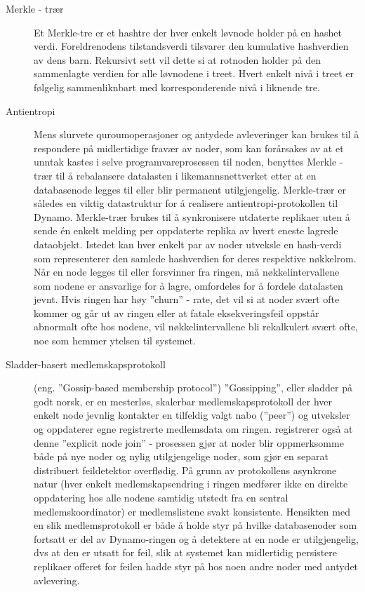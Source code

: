 \begin{description}
  \item [Merkle - trær] Et Merkle-tre er et hashtre der hver enkelt løvnode holder på en hashet verdi. Foreldrenodens tilstandsverdi tilsvarer den kumulative hashverdien av dens barn. Rekursivt sett vil dette si at rotnoden holder på den sammenlagte verdien for alle løvnodene i treet. Hvert enkelt nivå i treet er følgelig sammenliknbart med korresponderende nivå i liknende tre.
  \item [Antientropi] Mens slurvete quroumoperasjoner og antydede avleveringer kan brukes til å respondere på midlertidige fravær av noder, som kan forårsakes av at et unntak kastes i selve programvareprosessen til noden, benyttes Merkle - trær til å rebalansere datalasten i likemannsnettverket etter at en databasenode legges til eller blir permanent utilgjengelig. Merkle-trær er således en viktig datastruktur for å realisere antientropi-protokollen til Dynamo. Merkle-trær brukes til å synkronisere utdaterte replikaer uten å sende én enkelt melding per oppdaterte replika av hvert eneste lagrede dataobjekt. Istedet kan hver enkelt par av noder utveksle en hash-verdi som representerer den samlede hashverdien for deres respektive nøkkelrom. Når en node legges til eller forsvinner fra ringen, må nøkkelintervallene som nodene er ansvarlige for å lagre, omfordeles for å fordele datalasten jevnt. Hvis ringen har høy ''churn'' - rate, det vil si at noder svært ofte kommer og går ut av ringen eller at fatale eksekveringsfeil oppstår abnormalt ofte hos nodene, vil nøkkelintervallene bli rekalkulert svært ofte, noe som hemmer ytelsen til systemet.
  \item [Sladder-basert medlemskapsprotokoll] (eng. ''Gossip-based member\-ship protocol'') ''Gossipping'', eller sladder på godt norsk, er en mesterløs, skalerbar medlemskapsprotokoll der hver enkelt node jevnlig kontakter en tilfeldig valgt nabo (''peer'') og utveksler og oppdaterer egne registrerte medlemsdata om ringen. \cite{decandia2007} registrerer også at denne ''explicit node join'' - prosessen gjør at noder blir oppmerksomme både på nye noder og nylig utilgjengelige noder, som gjør en separat distribuert feildetektor overflødig. På grunn av protokollens asynkrone natur (hver enkelt medlemskapsendring i ringen medfører ikke en direkte oppdatering hos alle nodene samtidig utstedt fra en sentral medlemskoordinator) er medlemslistene svakt konsistente. Hensikten med en slik medlemsprotokoll er både å holde styr på hvilke databasenoder som fortsatt er del av Dynamo-ringen og å detektere at en node er utilgjengelig, dvs at den er utsatt for feil, slik at systemet kan midlertidig persistere replikaer offeret for feilen hadde styr på hos noen andre noder med antydet avlevering.

\end{description}
